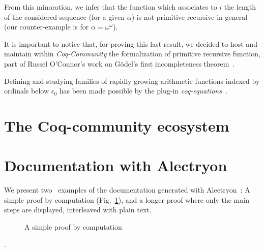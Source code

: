 \documentclass{easychair}
\makeatletter
\newcommand{\inputsnippets}[1]
  {{\setlength{\itemsep}{1pt}\setlength{\parsep}{0pt}%
    \alectryon@copymacros\begin{io}
      \forcsvlist{\item\@inputsnippet}{#1}
    \end{io}}}
\let@old Save definition of 
\newcommand{\@inputsnippet}[1]
  {{\renewenvironment{alectryon}{}{}%
    @old{../movies/snippets/#1}}}
\makeatother
\begin{document}
From this minoration, we infer that the function which associates to $i$ the length of the considered sequence (for a given $\alpha$) is not primitive recursive in general (our counter-example is for $\alpha=\omega^\omega$).

It is important to notice that, for proving this last result, we decided to host and maintain within \emph{Coq-Community} the formalization of primitive recursive function, part of Russel O'Connor's work on G\"{o}del's first incompleteness theorem~\cite{OConnor05}.

Defining and studying families of rapidly growing arithmetic  functions indexed by ordinals below $\epsilon_0$ has been made possible by the plug-in \emph{coq-equations}~\cite{sozeau:hal-01671777}.


\section{The Coq-community ecosystem}


\section{Documentation with Alectryon}

We present two ~examples of the documentation generated with Alectryon~\cite{alectryonpaper}: A simple proof by computation (Fig.~\ref{fig:Ex42E0}), and a longer proof where only the main steps are displayed, interleaved with plain text.

  \begin{figure}[h]
    \centering
    \fbox{
      \begin{minipage}[h]{1.0\linewidth}
        \inputsnippets{E0/Ex42}
      \end{minipage}}
    \caption{A simple proof by computation}
    \label{fig:Ex42E0}
  \end{figure}
\label{Ex42-E0}.


\end{document}
